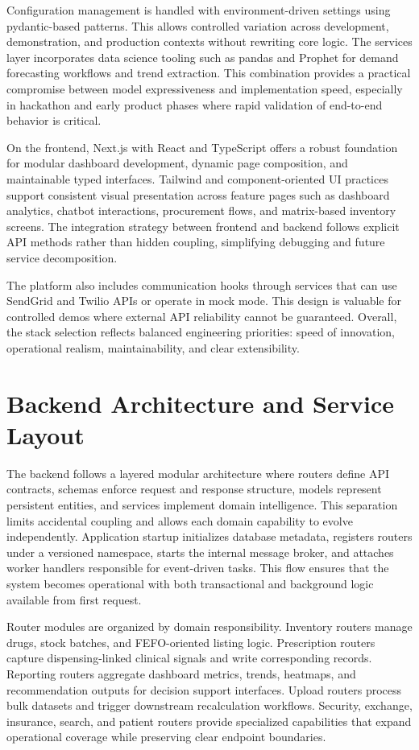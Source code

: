 \documentclass[12pt,a4paper]{report}
\begin{document}
Configuration management is handled with environment-driven settings using pydantic-based patterns. This allows controlled variation across development, demonstration, and production contexts without rewriting core logic. The services layer incorporates data science tooling such as pandas and Prophet for demand forecasting workflows and trend extraction. This combination provides a practical compromise between model expressiveness and implementation speed, especially in hackathon and early product phases where rapid validation of end-to-end behavior is critical.

On the frontend, Next.js with React and TypeScript offers a robust foundation for modular dashboard development, dynamic page composition, and maintainable typed interfaces. Tailwind and component-oriented UI practices support consistent visual presentation across feature pages such as dashboard analytics, chatbot interactions, procurement flows, and matrix-based inventory screens. The integration strategy between frontend and backend follows explicit API methods rather than hidden coupling, simplifying debugging and future service decomposition.

The platform also includes communication hooks through services that can use SendGrid and Twilio APIs or operate in mock mode. This design is valuable for controlled demos where external API reliability cannot be guaranteed. Overall, the stack selection reflects balanced engineering priorities: speed of innovation, operational realism, maintainability, and clear extensibility.

\chapter{Backend Architecture and Service Layout}
The backend follows a layered modular architecture where routers define API contracts, schemas enforce request and response structure, models represent persistent entities, and services implement domain intelligence. This separation limits accidental coupling and allows each domain capability to evolve independently. Application startup initializes database metadata, registers routers under a versioned namespace, starts the internal message broker, and attaches worker handlers responsible for event-driven tasks. This flow ensures that the system becomes operational with both transactional and background logic available from first request.

Router modules are organized by domain responsibility. Inventory routers manage drugs, stock batches, and FEFO-oriented listing logic. Prescription routers capture dispensing-linked clinical signals and write corresponding records. Reporting routers aggregate dashboard metrics, trends, heatmaps, and recommendation outputs for decision support interfaces. Upload routers process bulk datasets and trigger downstream recalculation workflows. Security, exchange, insurance, search, and patient routers provide specialized capabilities that expand operational coverage while preserving clear endpoint boundaries.
\end{document}

